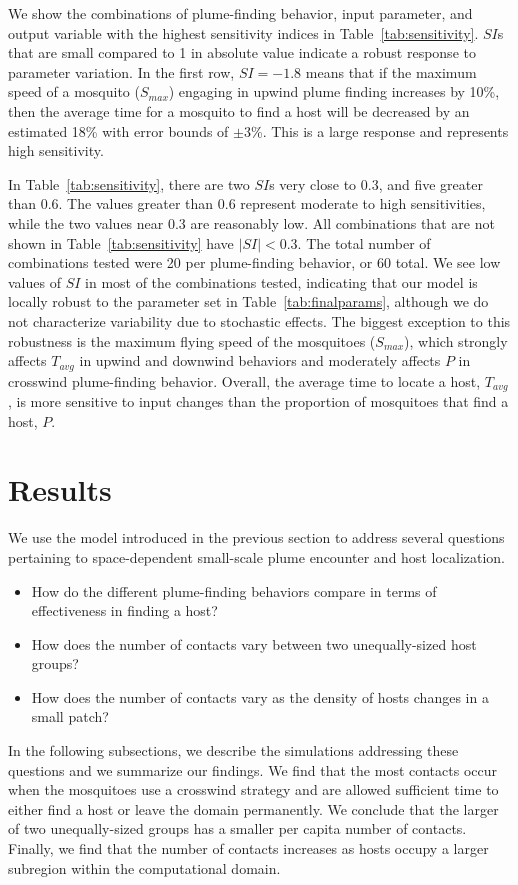\documentclass[10pt]{article}
\begin{document}
We show the combinations of plume-finding behavior, input parameter, and output variable with the highest sensitivity indices in Table~\ref{tab:sensitivity}. $SI$s that are small compared to 1 in absolute value indicate a robust response to parameter variation. In the first row, $SI = -1.8$ means that if the maximum speed of a mosquito ($S_{max}$) engaging in upwind plume finding increases by 10\%, then the average time for a mosquito to find a host will be decreased by an estimated 18\% with error bounds of $\pm$3\%.  This is a large response and represents high sensitivity. 

In Table~\ref{tab:sensitivity}, there are two $SI$s very close to 0.3, and five greater than 0.6. The values greater than 0.6 represent moderate to high sensitivities, while the two values near 0.3 are reasonably low. All combinations that are not shown in Table~\ref{tab:sensitivity} have $|SI| < 0.3$. The total number of combinations tested were 20 per plume-finding behavior, or 60 total. We see low values of $SI$ in most of the combinations tested, indicating that our model is locally robust to the parameter set in Table~\ref{tab:finalparams}, although we do not characterize variability due to stochastic effects. The biggest exception to this robustness is the maximum flying speed of the mosquitoes ($S_{max}$), which strongly affects $T_{avg}$ in upwind and downwind behaviors and moderately affects $P$ in crosswind plume-finding behavior. Overall, the average time to locate a host, $T_{avg}$, is more sensitive to input changes than the proportion of mosquitoes that find a host, $P$. 


\section*{Results}
 We use the model introduced in the previous section to address several questions pertaining to space-dependent  small-scale plume encounter and host localization.
	\begin{itemize}
		\item How do the different plume-finding behaviors compare in terms of effectiveness in finding a host?
		\item How does the number of contacts vary between two unequally-sized host groups?
		\item How does the number of contacts vary as the density of hosts changes in a small patch?
	\end{itemize}
In the following subsections, we describe the simulations addressing these questions and we summarize our findings. We find that the most contacts occur when the mosquitoes use a crosswind strategy and are allowed sufficient time to either find a host or leave the domain permanently. We conclude that the larger of two unequally-sized groups has a smaller per capita number of contacts. Finally, we find that the number of contacts increases as hosts occupy a larger subregion within the computational domain.
	
\end{document}
